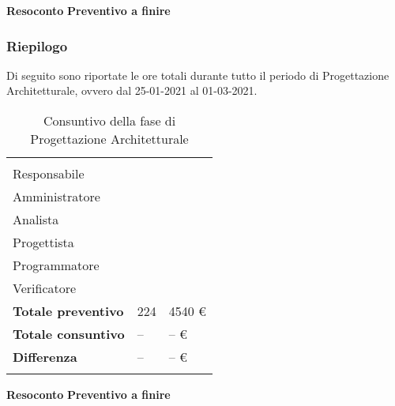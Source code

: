 \textbf{Resoconto}
\textbf{Preventivo a finire}

\subsubsection{Riepilogo}

Di seguito sono riportate le ore totali durante tutto il periodo di Progettazione Architetturale, ovvero dal 25-01-2021 al 01-03-2021.

\begin{longtable}{ C{4cm} C{3cm} C{3.5cm}} 
 	 &
 	 &
 	 \\
 	
 	Responsabile &  & \\
 	Amministratore &  & \\
 	Analista & & \\
 	Progettista & & \\
 	Programmatore & &\\
 	Verificatore & & \\
 	
	\hline 	
 	
 	\textbf{Totale preventivo} &
	224 &
 	4540 € \\		
 	
 	\textbf{Totale consuntivo} &
	-- &
 	-- € \\	
 	
 	\textbf{Differenza} &
	-- &
 	-- € \\		
 	
 	\caption{Consuntivo della fase di Progettazione Architetturale}
\end{longtable}

\textbf{Resoconto}
\textbf{Preventivo a finire}